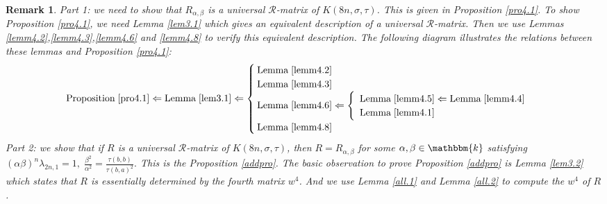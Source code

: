 \documentclass[a4paper,11pt]{amsart}
\def \k{\mathbbm{k}}
\numberwithin{equation}{section}
\newtheorem{remark}[theorem]{Remark}
\begin{document}
\begin{remark}
\emph{Part 1:} we need to show that $R_{\alpha,\beta}$ is a universal $\mathcal{R}$-matrix of $K(8n,\sigma,\tau)$. \emph{This is given in Proposition \ref{pro4.1}. To show Proposition \ref{pro4.1}, we need Lemma \ref{lem3.1} which gives an equivalent description of a universal $\mathcal{R}$-matrix. Then we use Lemmas \ref{lemm4.2},\ref{lemm4.3},\ref{lemm4.6} and \ref{lemm4.8}  to verify this equivalent description.
  The following diagram illustrates the relations between these lemmas and Proposition \ref{pro4.1}:
$$\text{Proposition}\; \ref{pro4.1} \Leftarrow \text{Lemma}\; \ref{lem3.1} \Leftarrow \begin{cases}
    \text{Lemma}\;\ref{lemm4.2}\\
    \text{Lemma}\;\ref{lemm4.3}\\
    \text{Lemma}\;\ref{lemm4.6} \Leftarrow \left\{
    \begin{array}{l}
        \text{Lemma}\;\ref{lemm4.5} \Leftarrow \text{Lemma}\;\ref{lemm4.4}\\
        \text{Lemma}\;\ref{lemm4.1}
	\end{array}
	\right.\\
    \text{Lemma}\;\ref{lemm4.8}&
\end{cases}
$$
Part 2: } we show that if $R$ is a universal $\mathcal{R}$-matrix of $K(8n,\sigma,\tau)$, then $R=R_{\alpha,\beta}$ for some $\alpha,\beta\in \k$ satisfying $(\alpha\beta)^n\lambda_{2n,1}=1,\;\frac{\beta^2}{\alpha^2}
=\frac{\tau(b,b)}{\tau(b,a)^2}.$ \emph{This is the Proposition \ref{addpro}. The basic observation to prove Proposition \ref{addpro} is Lemma \ref{lem3.2} which states that $R$ is \emph{essentially} determined by the fourth matrix $w^4$. And we use Lemma \ref{all.1} and Lemma \ref{all.2} to compute the $w^4$ of $R$. }
\end{remark}
\end{document}
